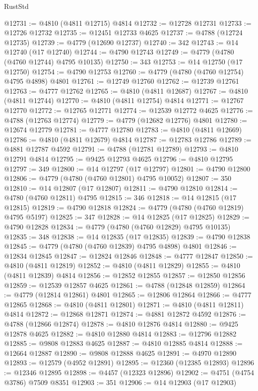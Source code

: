 \begin{lexlean}{RustStd}
\begin{coremodule}
@12731 := @4810 (@4811 @12715) @4814
@12732 := @12728 @12731
@12733 := @12726 @12732
@12735 := @12451 @12733 @4625
@12737 := @4788 (@12724 @12735)
@12739 := @4779 (@12690 @12737)
@12740 := 342
@12743 := @14 @12740 (@17 @12740)
@12744 := @4790 @12743
@12749 := @4779 (@4780 (@4760 @12744) @4795 @10135)
@12750 := 343
@12753 := @14 @12750 (@17 @12750)
@12754 := @4790 @12753
@12760 := @4779 (@4780 (@4760 @12754) @4795 @4898) @4801
@12761 := @12749 @12760
@12762 := @12739 @12761
@12763 := @4777 @12762
@12765 := @4810 (@4811 @12687)
@12767 := @4810 (@4811 @12744)
@12770 := @4810 (@4811 @12754) @4814
@12771 := @12767 @12770
@12772 := @12765 @12771
@12774 := @12539 @12772 @4625
@12776 := @4788 (@12763 @12774)
@12779 := @4779 (@12682 @12776) @4801
@12780 := @12674 @12779
@12781 := @4777 @12780
@12783 := @4810 (@4811 @12669)
@12786 := @4810 (@4811 @12679) @4814
@12787 := @12783 @12786
@12789 := @4881 @12787 @4592
@12791 := @4788 (@12781 @12789)
@12793 := @4810 @12791 @4814
@12795 := @9425 @12793 @4625
@12796 := @4810 @12795
@12797 := 349
@12800 := @14 @12797 (@17 @12797)
@12801 := @4790 @12800
@12806 := @4779 (@4780 (@4760 @12801) @4795 @10052)
@12807 := 350
@12810 := @14 @12807 (@17 @12807)
@12811 := @4790 @12810
@12814 := @4780 (@4760 @12811) @4795
@12815 := 346
@12818 := @14 @12815 (@17 @12815)
@12819 := @4790 @12818
@12824 := @4779 (@4780 (@4760 @12819) @4795 @5197)
@12825 := 347
@12828 := @14 @12825 (@17 @12825)
@12829 := @4790 @12828
@12834 := @4779 (@4780 (@4760 @12829) @4795 @10135)
@12835 := 348
@12838 := @14 @12835 (@17 @12835)
@12839 := @4790 @12838
@12845 := @4779 (@4780 (@4760 @12839) @4795 @4898) @4801
@12846 := @12834 @12845
@12847 := @12824 @12846
@12848 := @4777 @12847
@12850 := @4810 (@4811 @12819)
@12852 := @4810 (@4811 @12829)
@12855 := @4810 (@4811 @12839) @4814
@12856 := @12852 @12855
@12857 := @12850 @12856
@12859 := @12539 @12857 @4625
@12861 := @4788 (@12848 @12859)
@12864 := @4779 (@12814 @12861) @4801
@12865 := @12806 @12864
@12866 := @4777 @12865
@12868 := @4810 (@4811 @12801)
@12871 := @4810 (@4811 @12811) @4814
@12872 := @12868 @12871
@12874 := @4881 @12872 @4592
@12876 := @4788 (@12866 @12874)
@12878 := @4810 @12876 @4814
@12880 := @9425 @12878 @4625
@12882 := @4810 @12880 @4814
@12883 := @12796 @12882
@12885 := @9808 @12883 @4625
@12887 := @4810 @12885 @4814
@12888 := @12664 @12887
@12890 := @9808 @12888 @4625
@12891 := @4970 @12890
@12893 := @12579 (@4952 @12891)
@12895 := @12360 (@12385 @12893)
@12896 := @12346 @12895
@12898 := @4457 (@12323 @12896)
@12902 := @4751 (@4754 @3786) @7509 @8351
@12903 := 351
@12906 := @14 @12903 (@17 @12903)

\end{coremodule}
\end{lexlean}
